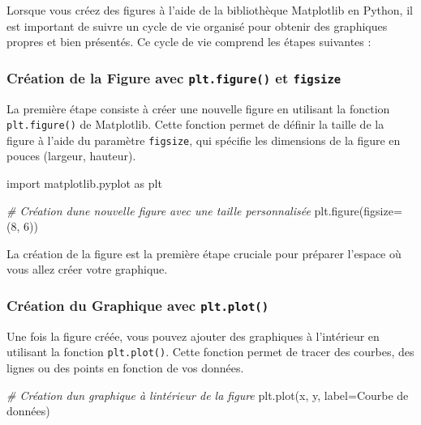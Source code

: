 \documentclass[11pt]{article}
\newenvironment{Shaded}{}{}
\newcommand{\DecValTok}[1]{\textcolor[rgb]{0.25,0.63,0.44}{{#1}}}
\newcommand{\StringTok}[1]{\textcolor[rgb]{0.25,0.44,0.63}{{#1}}}
\newcommand{\CommentTok}[1]{\textcolor[rgb]{0.38,0.63,0.69}{\textit{{#1}}}}
\newcommand{\NormalTok}[1]{{#1}}
\newcommand{\ImportTok}[1]{{#1}}
\newcommand{\OperatorTok}[1]{\textcolor[rgb]{0.40,0.40,0.40}{{#1}}}
\begin{document}
Lorsque vous créez des figures à l'aide de la bibliothèque Matplotlib en
Python, il est important de suivre un cycle de vie organisé pour obtenir
des graphiques propres et bien présentés. Ce cycle de vie comprend les
étapes suivantes :

\hypertarget{cruxe9ation-de-la-figure-avec-plt.figure-et-figsize}{%
\subsubsection{\texorpdfstring{\textbf{Création de la Figure avec
\texttt{plt.figure()} et
\texttt{figsize}}}{Création de la Figure avec plt.figure() et figsize}}\label{cruxe9ation-de-la-figure-avec-plt.figure-et-figsize}}

La première étape consiste à créer une nouvelle figure en utilisant la
fonction \texttt{plt.figure()} de Matplotlib. Cette fonction permet de
définir la taille de la figure à l'aide du paramètre \texttt{figsize},
qui spécifie les dimensions de la figure en pouces (largeur, hauteur).

\begin{Shaded}
\begin{Highlighting}[]
\ImportTok{import}\NormalTok{ matplotlib.pyplot }\ImportTok{as}\NormalTok{ plt}

\CommentTok{\# Création d\textquotesingle{}une nouvelle figure avec une taille personnalisée}
\NormalTok{plt.figure(figsize}\OperatorTok{=}\NormalTok{(}\DecValTok{8}\NormalTok{, }\DecValTok{6}\NormalTok{))}
\end{Highlighting}
\end{Shaded}

La création de la figure est la première étape cruciale pour préparer
l'espace où vous allez créer votre graphique.

\hypertarget{cruxe9ation-du-graphique-avec-plt.plot}{%
\subsubsection{\texorpdfstring{\textbf{Création du Graphique avec
\texttt{plt.plot()}}}{Création du Graphique avec plt.plot()}}\label{cruxe9ation-du-graphique-avec-plt.plot}}

Une fois la figure créée, vous pouvez ajouter des graphiques à
l'intérieur en utilisant la fonction \texttt{plt.plot()}. Cette fonction
permet de tracer des courbes, des lignes ou des points en fonction de
vos données.

\begin{Shaded}
\begin{Highlighting}[]
\CommentTok{\# Création d\textquotesingle{}un graphique à l\textquotesingle{}intérieur de la figure}
\NormalTok{plt.plot(x, y, label}\OperatorTok{=}\StringTok{\textquotesingle{}Courbe de données\textquotesingle{}}\NormalTok{)}
\end{Highlighting}
\end{Shaded}
\end{document}

